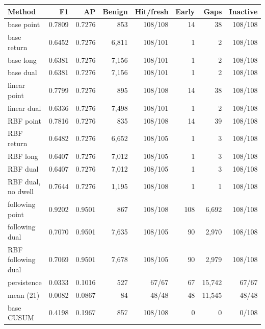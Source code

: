 \begin{tabular}{lrrrrrrr}\toprule
Method & F1 & AP & Benign & Hit/fresh & Early & Gaps & Inactive \\\midrule
base point & 0.7809 & 0.7276 & 853 & 108/108 & 14 & 38 & 108/108 \\
base return & 0.6452 & 0.7276 & 6,811 & 108/101 & 1 & 2 & 108/108 \\
base long & 0.6381 & 0.7276 & 7,156 & 108/101 & 1 & 2 & 108/108 \\
base dual & 0.6381 & 0.7276 & 7,156 & 108/101 & 1 & 2 & 108/108 \\
linear point & 0.7799 & 0.7276 & 895 & 108/108 & 14 & 38 & 108/108 \\
linear dual & 0.6336 & 0.7276 & 7,498 & 108/101 & 1 & 2 & 108/108 \\
RBF point & 0.7816 & 0.7276 & 835 & 108/108 & 14 & 39 & 108/108 \\
RBF return & 0.6482 & 0.7276 & 6,652 & 108/105 & 1 & 3 & 108/108 \\
RBF long & 0.6407 & 0.7276 & 7,012 & 108/105 & 1 & 3 & 108/108 \\
RBF dual & 0.6407 & 0.7276 & 7,012 & 108/105 & 1 & 3 & 108/108 \\
RBF dual, no dwell & 0.7644 & 0.7276 & 1,195 & 108/108 & 1 & 1 & 108/108 \\
following point & 0.9202 & 0.9501 & 867 & 108/108 & 108 & 6,692 & 108/108 \\
following dual & 0.7070 & 0.9501 & 7,635 & 108/105 & 90 & 2,970 & 108/108 \\
RBF following dual & 0.7069 & 0.9501 & 7,678 & 108/105 & 90 & 2,979 & 108/108 \\
persistence & 0.0333 & 0.1016 & 527 & 67/67 & 67 & 15,742 & 67/67 \\
mean (21) & 0.0082 & 0.0867 & 84 & 48/48 & 48 & 11,545 & 48/48 \\
base CUSUM & 0.4198 & 0.1967 & 857 & 108/108 & 0 & 0 & 0/108 \\
\bottomrule\end{tabular}
